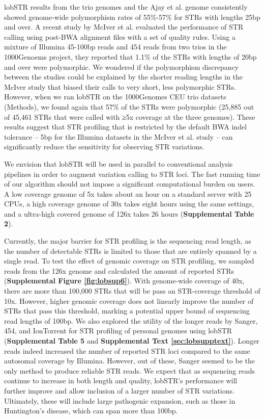 lobSTR results from the trio genomes and the Ajay et al. genome consistently showed genome-wide polymorphism rates of 55\%-57\% for STRs with lengths 25bp and over. A recent study by McIver et al. \cite{McIverFondonSkinnerEtAl2011} evaluated the performance of STR calling using post-BWA alignment files with a set of quality rules. Using a mixture of Illumina 45-100bp reads and 454 reads from two trios in the 1000Genoems project, they reported that 1.1\% of the STRs with lengths of 20bp and over were polymorphic. We wondered if the polymorphism discrepancy between the studies could be explained by the shorter reading lengths in the McIver study that biased their calls to very short, less polymorphic STRs. However, when we ran lobSTR on the 1000Genomes CEU trio datasets (Methods), we found again that 57\% of the STRs were polymorphic (25,885 out of 45,461 STRs that were called with ≥5x coverage at the three genomes). These results suggest that STR profiling that is restricted by the default BWA indel tolerance -- 5bp for the Illumina datasets in the McIver et al. study -- can significantly reduce the sensitivity for observing STR variations. 

We envision that lobSTR will be used in parallel to conventional analysis pipelines in order to augment variation calling to STR loci. The fast running time of our algorithm should not impose a significant computational burden on users. A low coverage genome of 5x takes about an hour on a standard server with 25 CPUs, a high coverage genome of 30x takes eight hours using the same settings, and a ultra-high covered genome of 126x takes 26 hours (\textbf{Supplemental Table 2}).

Currently, the major barrier for STR profiling is the sequencing read length, as the number of detectable STRs is limited to those that are entirely spanned by a single read. To test the effect of genomic coverage on STR profiling, we sampled reads from the 126x genome and calculated the amount of reported STRs (\textbf{Supplemental Figure \ref{fig:lobsup6}}). With genome-wide coverage of 40x, there are more than 100,000 STRs that will be pass an STR-coverage threshold of 10x. However, higher genomic coverage does not linearly improve the number of STRs that pass this threshold, marking a potential upper bound of sequencing read lengths of 100bp. We also explored the utility of the longer reads by Sanger, 454, and IonTorrent for STR profiling of personal genomes using lobSTR (\textbf{Supplemental Table 5} and \textbf{Supplemental Text \ref{sec:lobsupptext}}). Longer reads indeed increased the number of reported STR loci compared to the same autosomal coverage by Illumina. However, out of these, Sanger seemed to be the only method to produce reliable STR reads. We expect that as sequencing reads continue to increase in both length and quality, lobSTR's performance will further improve and allow inclusion of a larger number of STR variations. Ultimately, these will include large pathogenic expansion, such as those in Huntington's disease, which can span more than 100bp. 

